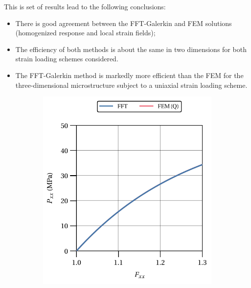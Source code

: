 This is set of results lead to the following conclusions:
\begin{itemize}
  \item There is good agreement between the FFT-Galerkin and FEM solutions (homogenized response and local strain fields);
  \item The efficiency of both methods is about the same in two dimensions for both strain loading schemes considered.
  \item The FFT-Galerkin method is markedly more efficient than the FEM for the three-dimensional microstructure subject to a uniaxial strain loading scheme.
\end{itemize}

\begin{figure}[hbt]
  \centering
	\begin{subfigure}[b]{0.49\textwidth}
    \centering
    \includegraphics[width=\textwidth]{figures/hencky_2D_normal_material_response}
    \caption{}
    \label{subfig:hencky_2D_normal_material_response}
  \end{subfigure}
  \begin{subfigure}[b]{0.49\textwidth}
    \centering

\end{subfigure}
\end{figure}

